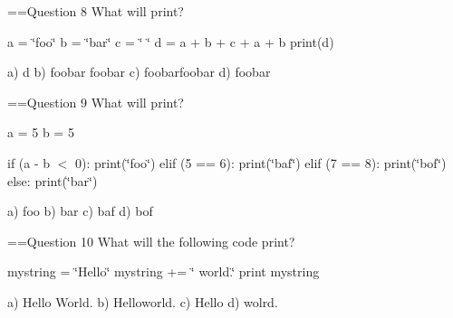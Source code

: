 ==Question 8 What will print?

a = \char`\"{}foo\char`\"{} b = \char`\"{}bar\char`\"{} c = \char`\"{} \char`\"{} d = a + b + c + a + b print(d)

a) d b) foobar foobar c) foobarfoobar d) foobar

==Question 9 What will print?

a = 5 b = 5

if (a -\/ b $<$ 0)\+: print(\char`\"{}foo\char`\"{}) elif (5 == 6)\+: print(\char`\"{}baf\char`\"{}) elif (7 == 8)\+: print(\char`\"{}bof\char`\"{}) else\+: print(\char`\"{}bar\char`\"{})

a) foo b) bar c) baf d) bof

==Question 10 What will the following code print?

mystring = \char`\"{}\+Hello\char`\"{} mystring += \char`\"{} world.\char`\"{} print mystring

a) Hello World. b) Helloworld. c) Hello d) wolrd. 